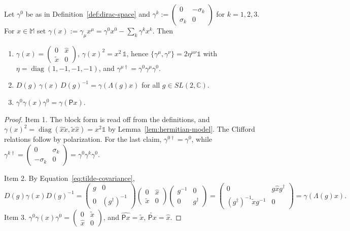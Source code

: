 	\begin{lemma}\label{lem:gamma}
		Let $\gamma^0$ be as in Definition~\ref{def:dirac-space} and $\gamma^k:=\begin{pmatrix}0&-\sigma_k\\\sigma_k&0\end{pmatrix}$ for $k=1,2,3$. For $x\in\mathbb{M}$ set $\gamma(x):=\gamma_\mu x^\mu=\gamma^0x^0-\sum_k\gamma^kx^k$. Then
		\begin{enumerate}
			\item $\gamma(x)=\begin{pmatrix}0&\hat{x}\\\tilde{x}&0\end{pmatrix}$, $\gamma(x)^2=x^2\,\mathbb{1}$, hence $\{\gamma^\mu,\gamma^\nu\}=2\eta^{\mu\nu}\mathbb{1}$ with $\eta=\operatorname{diag}(1,-1,-1,-1)$, and $\gamma^{\mu\dagger}=\gamma^0\gamma^\mu\gamma^0$.
			\item $D(g)\,\gamma(x)\,D(g)^{-1}=\gamma(\Lambda(g)x)$ for all $g\in SL(2,\mathbb{C})$.
			\item $\gamma^0\gamma(x)\gamma^0=\gamma(\mathsf{P}x)$.
		\end{enumerate}
	\end{lemma}
	
	\begin{proof}
		Item 1. The block form is read off from the definitions, and $\gamma(x)^2=\operatorname{diag}(\hat{x}\tilde{x},\tilde{x}\hat{x})=x^2\mathbb{1}$ by Lemma~\ref{lem:hermitian-model}. The Clifford relations follow by polarization. For the last claim, $\gamma^{0\dagger}=\gamma^0$, while $\gamma^{k\dagger}=\begin{pmatrix}0&\sigma_k\\-\sigma_k&0\end{pmatrix}=\gamma^0\gamma^k\gamma^0$.
		
		Item 2. By Equation~\eqref{eq:tilde-covariance},
		\begin{equation*}
			D(g)\gamma(x)D(g)^{-1}=\begin{pmatrix}g&0\\0&(g^\dagger)^{-1}\end{pmatrix}\begin{pmatrix}0&\hat{x}\\\tilde{x}&0\end{pmatrix}\begin{pmatrix}g^{-1}&0\\0&g^\dagger\end{pmatrix}=\begin{pmatrix}0&g\hat{x}g^\dagger\\(g^\dagger)^{-1}\tilde{x}g^{-1}&0\end{pmatrix}=\gamma(\Lambda(g)x).
		\end{equation*}
		Item 3. $\gamma^0\gamma(x)\gamma^0=\begin{pmatrix}0&\tilde{x}\\\hat{x}&0\end{pmatrix}$, and $\widehat{\mathsf{P}x}=\tilde{x}$, $\widetilde{\mathsf{P}x}=\hat{x}$.
	\end{proof}
	
